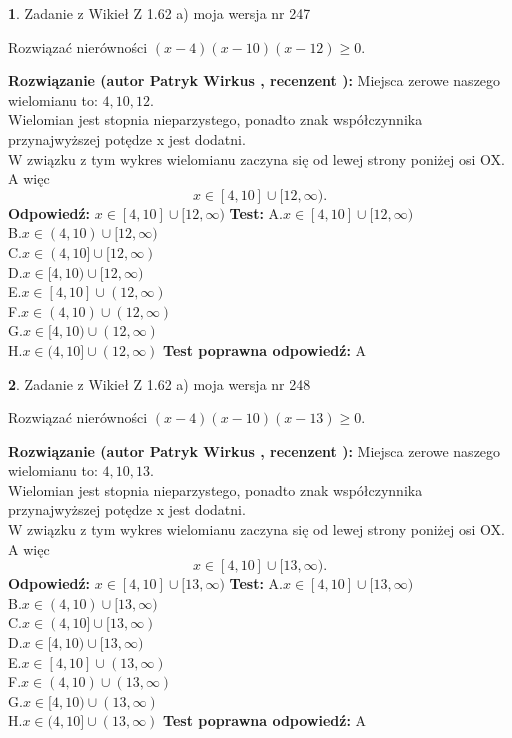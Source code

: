 \documentclass[12pt, a4paper]{article}
\theoremstyle{definition} %
\newtheorem{zad}{}
\newcommand{\zadStart}[1]{\begin{zad}#1\newline}
\newcommand{\zadStop}{\end{zad}}
\newcommand{\rozwStart}[2]{\noindent \textbf{Rozwiązanie (autor #1 , recenzent #2): }\newline}
\newcommand{\rozwStop}{\newline}
\newcommand{\odpStart}{\noindent \textbf{Odpowiedź:}\newline}
\newcommand{\odpStop}{\newline}
\newcommand{\testStart}{\noindent \textbf{Test:}\newline}
\newcommand{\testStop}{\newline}
\newcommand{\kluczStart}{\noindent \textbf{Test poprawna odpowiedź:}\newline}
\newcommand{\kluczStop}{\newline}
\begin{document}
\zadStart{Zadanie z Wikieł Z 1.62 a) moja wersja nr 247}

Rozwiązać nierówności $(x-4)(x-10)(x-12)\ge0$.
\zadStop
\rozwStart{Patryk Wirkus}{}
Miejsca zerowe naszego wielomianu to: $4, 10, 12$.\\
Wielomian jest stopnia nieparzystego, ponadto znak współczynnika przy\linebreak najwyższej potędze x jest dodatni.\\ W związku z tym wykres wielomianu zaczyna się od lewej strony poniżej osi OX. A więc $$x \in [4,10] \cup [12,\infty).$$
\rozwStop
\odpStart
$x \in [4,10] \cup [12,\infty)$
\odpStop
\testStart
A.$x \in [4,10] \cup [12,\infty)$\\
B.$x \in (4,10) \cup [12,\infty)$\\
C.$x \in (4,10] \cup [12,\infty)$\\
D.$x \in [4,10) \cup [12,\infty)$\\
E.$x \in [4,10] \cup (12,\infty)$\\
F.$x \in (4,10) \cup (12,\infty)$\\
G.$x \in [4,10) \cup (12,\infty)$\\
H.$x \in (4,10] \cup (12,\infty)$
\testStop
\kluczStart
A
\kluczStop



\zadStart{Zadanie z Wikieł Z 1.62 a) moja wersja nr 248}

Rozwiązać nierówności $(x-4)(x-10)(x-13)\ge0$.
\zadStop
\rozwStart{Patryk Wirkus}{}
Miejsca zerowe naszego wielomianu to: $4, 10, 13$.\\
Wielomian jest stopnia nieparzystego, ponadto znak współczynnika przy\linebreak najwyższej potędze x jest dodatni.\\ W związku z tym wykres wielomianu zaczyna się od lewej strony poniżej osi OX. A więc $$x \in [4,10] \cup [13,\infty).$$
\rozwStop
\odpStart
$x \in [4,10] \cup [13,\infty)$
\odpStop
\testStart
A.$x \in [4,10] \cup [13,\infty)$\\
B.$x \in (4,10) \cup [13,\infty)$\\
C.$x \in (4,10] \cup [13,\infty)$\\
D.$x \in [4,10) \cup [13,\infty)$\\
E.$x \in [4,10] \cup (13,\infty)$\\
F.$x \in (4,10) \cup (13,\infty)$\\
G.$x \in [4,10) \cup (13,\infty)$\\
H.$x \in (4,10] \cup (13,\infty)$
\testStop
\kluczStart
A
\kluczStop
\end{document}
